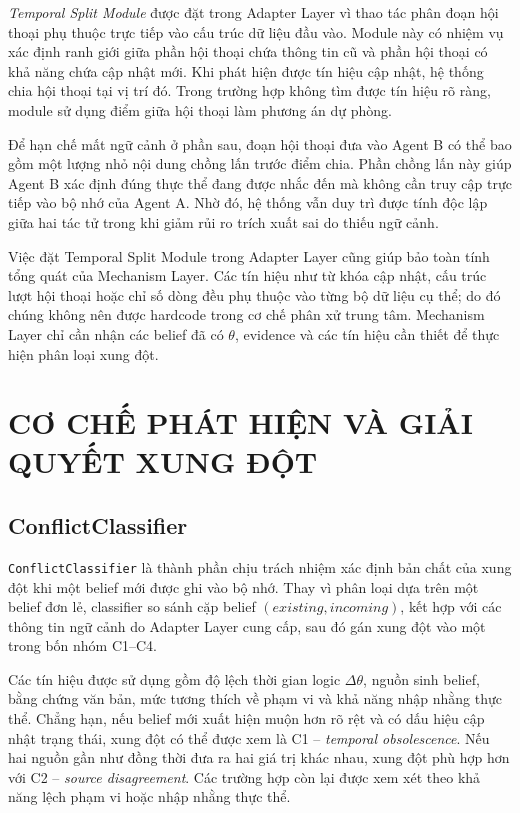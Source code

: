 \documentclass[12pt,a4paper]{article}
\newcommand{\code}[1]{\texttt{#1}}
\begin{document}
\textit{Temporal Split Module} được đặt trong Adapter Layer vì thao tác phân đoạn hội thoại phụ thuộc trực tiếp vào cấu trúc dữ liệu đầu vào. Module này có nhiệm vụ xác định ranh giới giữa phần hội thoại chứa thông tin cũ và phần hội thoại có khả năng chứa cập nhật mới. Khi phát hiện được tín hiệu cập nhật, hệ thống chia hội thoại tại vị trí đó. Trong trường hợp không tìm được tín hiệu rõ ràng, module sử dụng điểm giữa hội thoại làm phương án dự phòng.

Để hạn chế mất ngữ cảnh ở phần sau, đoạn hội thoại đưa vào Agent B có thể bao gồm một lượng nhỏ nội dung chồng lấn trước điểm chia. Phần chồng lấn này giúp Agent B xác định đúng thực thể đang được nhắc đến mà không cần truy cập trực tiếp vào bộ nhớ của Agent A. Nhờ đó, hệ thống vẫn duy trì được tính độc lập giữa hai tác tử trong khi giảm rủi ro trích xuất sai do thiếu ngữ cảnh.

Việc đặt Temporal Split Module trong Adapter Layer cũng giúp bảo toàn tính tổng quát của Mechanism Layer. Các tín hiệu như từ khóa cập nhật, cấu trúc lượt hội thoại hoặc chỉ số dòng đều phụ thuộc vào từng bộ dữ liệu cụ thể; do đó chúng không nên được hardcode trong cơ chế phân xử trung tâm. Mechanism Layer chỉ cần nhận các belief đã có \(\theta\), evidence và các tín hiệu cần thiết để thực hiện phân loại xung đột.


\section{CƠ CHẾ PHÁT HIỆN VÀ GIẢI QUYẾT XUNG ĐỘT}

\subsection{ConflictClassifier}

\code{ConflictClassifier} là thành phần chịu trách nhiệm xác định bản chất của xung đột khi một belief mới được ghi vào bộ nhớ. Thay vì phân loại dựa trên một belief đơn lẻ, classifier so sánh cặp belief \((existing, incoming)\), kết hợp với các thông tin ngữ cảnh do Adapter Layer cung cấp, sau đó gán xung đột vào một trong bốn nhóm C1--C4.

Các tín hiệu được sử dụng gồm độ lệch thời gian logic \(\Delta\theta\), nguồn sinh belief, bằng chứng văn bản, mức tương thích về phạm vi và khả năng nhập nhằng thực thể. Chẳng hạn, nếu belief mới xuất hiện muộn hơn rõ rệt và có dấu hiệu cập nhật trạng thái, xung đột có thể được xem là C1 -- \textit{temporal obsolescence}. Nếu hai nguồn gần như đồng thời đưa ra hai giá trị khác nhau, xung đột phù hợp hơn với C2 -- \textit{source disagreement}. Các trường hợp còn lại được xem xét theo khả năng lệch phạm vi hoặc nhập nhằng thực thể.
\end{document}
